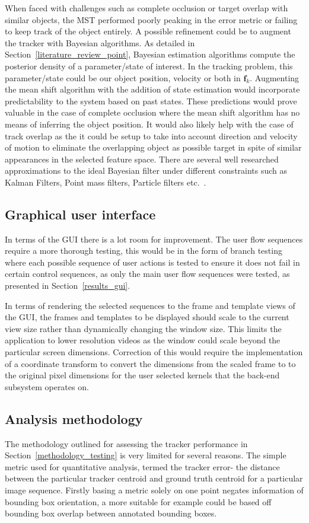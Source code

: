 When faced with challenges such as complete occlusion or target overlap with
similar objects, the MST performed poorly peaking in the error metric or failing
to keep track of the object entirely. A possible refinement could be to augment
the tracker with Bayesian algorithms. As detailed in
Section~\ref{literature_review_point}, Bayesian estimation algorithms compute
the posterior density of a parameter/state of interest. In the tracking
problem, this parameter/state could be our object position, velocity or both in
$\mathbf{f}_k$. 
Augmenting the mean shift algorithm with the addition of state estimation  would
incorporate predictability to the system based on past states. These predictions
would prove valuable in the case of complete occlusion where the mean shift
algorithm has no means of inferring the object position. It would also likely
help with the case of track overlap as the it could be setup to take into
account direction and velocity of motion to eliminate the overlapping object as
possible target in spite of similar appearances in the selected
feature space.
There are several well researched approximations to the ideal Bayesian filter
under different constraints such as Kalman Filters, Point mass filters, Particle
filters etc.~\cite{Challa2011}.  

\subsection{Graphical user interface}\label{future_analysis}
In terms of the GUI there is a lot room for improvement. The user flow sequences
require a more thorough testing, this would be in the form of branch testing where
each possible sequence of user actions is tested to ensure it does not fail in
certain control sequences, as only the main user flow sequences were tested, as
presented in Section~\ref{results_gui}.

In terms of rendering the selected sequences to the frame and template views
of the GUI, the frames and templates to be displayed should scale to the current
view size rather than dynamically changing the window size. This limits the
application to lower resolution videos as the window could scale beyond the
particular screen dimensions.
Correction of this would require the implementation of a coordinate transform
to convert the dimensions from the scaled frame to to the original pixel
dimensions for the user selected kernels that the back-end subsystem operates on.

\subsection{Analysis methodology}\label{future_analysis}
The methodology outlined for assessing the tracker performance in
Section~\ref{methodology_testing} is very limited for several reasons. 
The simple metric used for quantitative analysis, termed the tracker error- the
distance between the particular tracker centroid and ground truth centroid for a
particular image sequence. Firstly basing a metric solely on one point negates
information of bounding box orientation, a more suitable for example could be
based off bounding box overlap between annotated bounding boxes. 

